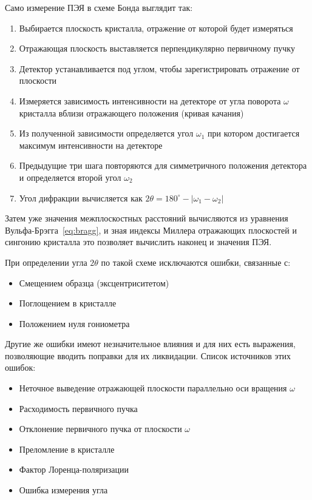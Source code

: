 \documentclass[a4paper,14pt]{extarticle}
\newcommand{\degree}{^\circ}
\begin{document}
Само измерение ПЭЯ в схеме Бонда выглядит так:
\begin{enumerate}
    \item Выбирается плоскость кристалла, отражение от которой будет измеряться
    \item Отражающая плоскость выставляется перпендикулярно первичному пучку
    \item Детектор устанавливается под углом, чтобы зарегистрировать отражение от плоскости
    \item Измеряется зависимость интенсивности на детекторе от угла поворота $\omega$ кристалла вблизи отражающего положения (кривая качания)
    \item Из полученной зависимости определяется угол $\omega_1$ при котором достигается максимум интенсивности на детекторе
    \item Предыдущие три шага повторяются для симметричного положения детектора и определяется второй угол $\omega_2$
    \item Угол дифракции вычисляется как $2\theta=180\degree-|\omega_1-\omega_2|$
\end{enumerate}
Затем уже значения межплоскостных расстояний вычисляются из уравнения Вульфа-Брэгга~\ref{eq:bragg}, и зная индексы Миллера отражающих плоскостей и сингонию кристалла это позволяет вычислить наконец и значения ПЭЯ.

При определении угла $2\theta$ по такой схеме исключаются ошибки, связанные с:
\begin{itemize}
    \item Смещением образца (эксцентриситетом)
    \item Поглощением в кристалле
    \item Положением нуля гониометра
\end{itemize}
Другие же ошибки имеют незначительное влияния и для них есть выражения, позволяющие вводить поправки для их ликвидации.
Список источников этих ошибок:
\begin{itemize}
    \item Неточное выведение отражающей плоскости параллельно оси вращения $\omega$
    \item Расходимость первичного пучка
    \item Отклонение первичного пучка от плоскости $\omega$
    \item Преломление в кристалле
    \item Фактор Лоренца-поляризации
    \item Ошибка измерения угла
\end{itemize}
\end{document}

